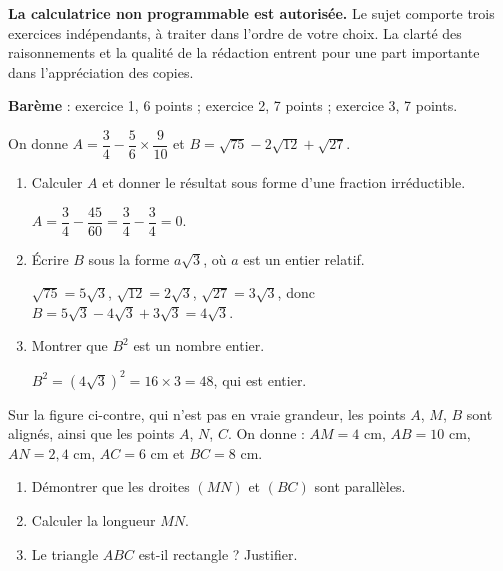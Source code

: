 \documentclass{veritas-epreuve}
\begin{document}
\titreepreuve

\begin{consignes}
\textbf{La calculatrice non programmable est autorisée.} Le sujet comporte trois exercices
indépendants, à traiter dans l'ordre de votre choix. La clarté des raisonnements et la
qualité de la rédaction entrent pour une part importante dans l'appréciation des copies.\par
\textbf{Barème} : exercice 1, 6 points ; exercice 2, 7 points ; exercice 3, 7 points.
\end{consignes}

On donne $A = \dfrac{3}{4} - \dfrac{5}{6} \times \dfrac{9}{10}$ et
$B = \sqrt{75} - 2\sqrt{12} + \sqrt{27}$.
\begin{enumerate}
  \item Calculer $A$ et donner le résultat sous forme d'une fraction irréductible.
  \begin{solution}
    $A = \dfrac{3}{4} - \dfrac{45}{60} = \dfrac{3}{4} - \dfrac{3}{4} = 0$. 
  \end{solution}
  \item Écrire $B$ sous la forme $a\sqrt{3}$, où $a$ est un entier relatif.
  \begin{solution}
    $\sqrt{75}=5\sqrt3$, $\sqrt{12}=2\sqrt3$, $\sqrt{27}=3\sqrt3$, donc
    $B = 5\sqrt3 - 4\sqrt3 + 3\sqrt3 = 4\sqrt3$. 
  \end{solution}
  \item Montrer que $B^2$ est un nombre entier.
  \begin{solution}
    $B^2 = (4\sqrt3)^2 = 16 \times 3 = 48$, qui est entier. 
  \end{solution}
\end{enumerate}

\begin{minipage}[t]{.55\linewidth}
Sur la figure ci-contre, qui n'est pas en vraie grandeur, les points $A$, $M$, $B$ sont
alignés, ainsi que les points $A$, $N$, $C$. On donne :
$AM = 4$ cm, $AB = 10$ cm, $AN = 2{,}4$ cm, $AC = 6$ cm et $BC = 8$ cm.
\begin{enumerate}
  \item Démontrer que les droites $(MN)$ et $(BC)$ sont parallèles.
  \item Calculer la longueur $MN$.
  \item Le triangle $ABC$ est-il rectangle ? Justifier.
\end{enumerate}
\end{minipage}\hfill
\begin{minipage}[t]{.4\linewidth}
\vspace{-4mm}
\centering
{}
\end{minipage}
\end{document}
